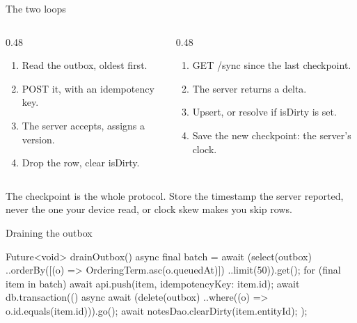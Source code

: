\documentclass[10pt,aspectratio=169,t]{beamer}
\begin{document}
\begin{frame}[eyebrow=Sync engine]{The two loops}
  \vskip 2mm
  \begin{columns}[T]
    \begin{column}{0.48\textwidth}
      \begin{enumerate}
        \item Read the outbox, oldest first.
        \item POST it, with an idempotency key.
        \item The server accepts, assigns a version.
        \item Drop the row, clear isDirty.
      \end{enumerate}
    \end{column}
    \begin{column}{0.48\textwidth}
      \begin{enumerate}
        \item GET /sync since the last checkpoint.
        \item The server returns a delta.
        \item Upsert, or resolve if isDirty is set.
        \item Save the new checkpoint: the server's clock.
      \end{enumerate}
    \end{column}
  \end{columns}
  \begin{takeaway}{The checkpoint is the whole protocol.}
    Store the timestamp the server reported, never the one your device read, or clock skew makes you skip rows.
  \end{takeaway}
\end{frame}

\begin{frame}[fragile,eyebrow=Sync engine]{Draining the outbox}
  \vskip 1mm
\begin{dart}
Future<void> drainOutbox() async {
  final batch = await (select(outbox)
        ..orderBy([(o) => OrderingTerm.asc(o.queuedAt)])
        ..limit(50)).get();
  for (final item in batch) {
    await api.push(item, idempotencyKey: item.id);
    await db.transaction(() async {
      await (delete(outbox)
          ..where((o) => o.id.equals(item.id))).go();
      await notesDao.clearDirty(item.entityId);
    });
  }
}
\end{dart}
\end{frame}
\end{document}
